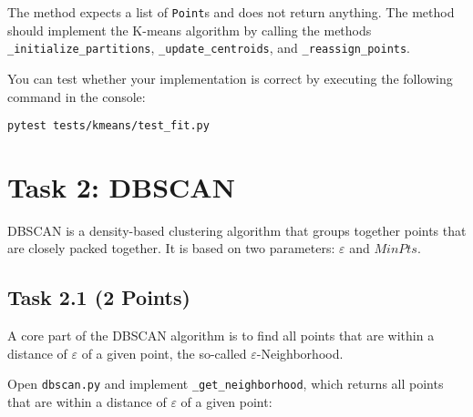 \documentclass[
english,
smallborders
]{i6prcsht}
\newcommand{\points}[1]{\hfill \color{red}(#1 Points)\color{black}}
\begin{document}
\vspace*{0.5cm}

The method expects a list of \texttt{Point}s and does not return anything. The method should implement the K-means algorithm by calling the methods \texttt{\_initialize\_partitions}, \texttt{\_update\_centroids}, and \texttt{\_reassign\_points}. 

You can test whether your implementation is correct by executing the following command in the console:

\vspace*{0.3cm}

\begin{lstlisting}
pytest tests/kmeans/test_fit.py
\end{lstlisting}

\newpage

\section*{Task 2: DBSCAN}
\label{sec:task-two}

DBSCAN is a density-based clustering algorithm that groups together points that are closely packed together. It is based on two parameters: $\varepsilon$ and $MinPts$. 

\subsection*{Task 2.1 \points{2}}

A core part of the DBSCAN algorithm is to find all points that are within a distance of $\varepsilon$ of a given point, the so-called $\varepsilon$-Neighborhood.

Open \texttt{dbscan.py} and implement \texttt{\_get\_neighborhood}, which returns all points that are within a distance of $\varepsilon$ of a given point:

\vspace*{0.3cm}
\end{document}
